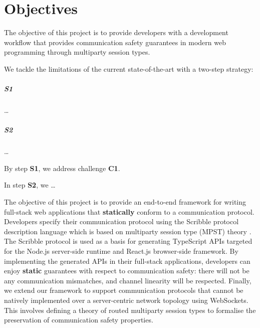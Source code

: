 \section{Objectives}

The objective of this project is to provide
developers with a development workflow
that provides communication safety guarantees in modern
web programming through multiparty session types.

We tackle the limitations of the current
state-of-the-art with a two-step strategy:

\subparagraph{S1}
\dots

\subparagraph{S2}
\dots

By step \textbf{S1}, we address challenge \textbf{C1}.

In step \textbf{S2}, we \dots

%

The objective of this project is to provide an end-to-end
framework for writing full-stack web applications that
\textbf{statically} conform to a communication protocol.
Developers specify their communication protocol using
the Scribble protocol description language \cite{Scribble}
which is based on multiparty session type (MPST) theory \cite{MPST}.
The Scribble protocol is used as a basis for generating
TypeScript APIs targeted for the Node.js server-side runtime
and React.js browser-side framework. 
By implementing the generated APIs in their full-stack applications,
developers can enjoy \textbf{static} guarantees with respect 
to communication safety: there will not be any communication mismatches,
and channel linearity will be respected.
Finally, we extend our framework to support communication
protocols that cannot be natively implemented over
a server-centric network topology using WebSockets.
This involves defining a theory of routed multiparty session types
to formalise the preservation of communication safety properties.

